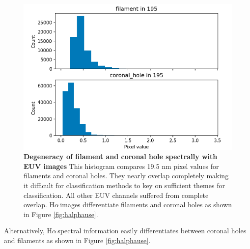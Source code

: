 \documentclass[twoside]{report}
\newcommand{\halpha}{H$\alpha$\,}
\begin{document}
\begin{figure}[ht]
  \begin{center}
    \includegraphics[scale=0.8]{degeneracy}
    \caption{{\bf Degeneracy of filament and coronal hole spectrally with EUV images} This histogram compares 19.5 nm pixel values for filaments and coronal holes. They nearly overlap completely making it difficult for classification methods to key on sufficient themes for classification. All other EUV channels suffered from complete overlap. \halpha images differentiate filaments and coronal holes as shown in Figure \ref{fig:halphause}.} 
    \label{fig:halphamotivation}
 \end{center}
\end{figure}


Alternatively, \halpha spectral information easily differentiates between coronal holes and filaments as shown in Figure \ref{fig:halphause}. 
\end{document}
